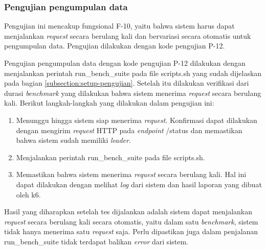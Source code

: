 \subsubsection{Pengujian pengumpulan data}
\label{subsubsection:pengujian-pengumpulan-data}

Pengujian ini mencakup fungsional F-10, yaitu bahwa sistem harus dapat menjalankan \textit{request} secara berulang kali dan bervariasi secara otomatis untuk pengumpulan data. Pengujian dilakukan dengan kode pengujian P-12. 


Pengujian pengumpulan data dengan kode pengujian P-12 dilakukan dengan menjalankan perintah run\_bench\_suite pada file scripts.sh yang sudah dijelaskan pada bagian \ref{subsection:setup-pengujian}. Setelah itu dilakukan verifikasi dari durasi \textit{benchmark} yang dilakukan bahwa sistem menerima \textit{request} secara berulang kali. Berikut langkah-langkah yang dilakukan dalam pengujian ini:

\begin{enumerate}
    \item Menunggu hingga sistem siap menerima \textit{request}. Konfirmasi dapat dilakukan dengan mengirim \textit{request} HTTP pada \textit{endpoint} /status dan memastikan bahwa sistem sudah memiliki \textit{leader}.
    \item Menjalankan perintah run\_bench\_suite pada file scripts.sh.
    \item Memastikan bahwa sistem menerima \textit{request} secara berulang kali. Hal ini dapat dilakukan dengan melihat \textit{log} dari sistem dan hasil laporan yang dibuat oleh k6.
\end{enumerate}

Hasil yang diharapkan setelah tes dijalankan adalah sistem dapat menjalankan \textit{request} secara berulang kali secara otomatis, yaitu dalam satu \textit{benchmark}, sistem tidak hanya menerima satu \textit{request} saja. Perlu dipastikan juga dalam penjalanan run\_bench\_suite tidak terdapat balikan \textit{error} dari sistem.